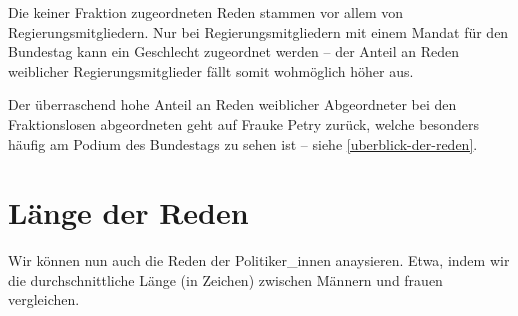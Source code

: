 \documentclass[oneside, 12pt, numbers=endperiod]{scrbook}
\theoremstyle{definition}
\theoremstyle{definition}
\theoremstyle{definition}
\theoremstyle{remark}
\begin{document}
Die keiner Fraktion zugeordneten Reden stammen vor allem von
Regierungsmitgliedern. Nur bei Regierungsmitgliedern mit einem Mandat
für den Bundestag kann ein Geschlecht zugeordnet werden -- der Anteil an
Reden weiblicher Regierungsmitglieder fällt somit wohmöglich höher aus.

Der überraschend hohe Anteil an Reden weiblicher Abgeordneter bei den
Fraktionslosen abgeordneten geht auf Frauke Petry zurück, welche
besonders häufig am Podium des Bundestags zu sehen ist -- siehe
\ref{uberblick-der-reden}.

\hypertarget{lange-der-reden}{%
\section{Länge der Reden}\label{lange-der-reden}}

Wir können nun auch die Reden der Politiker\_innen anaysieren. Etwa,
indem wir die durchschnittliche Länge (in Zeichen) zwischen Männern und
frauen vergleichen.
\end{document}
